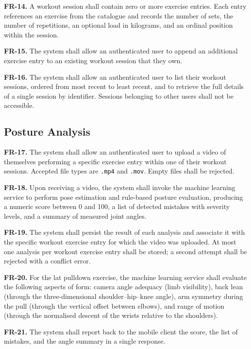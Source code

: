 \textbf{FR-14.} A workout session shall contain zero or more exercise entries. Each entry references an exercise from the catalogue and records the number of sets, the number of repetitions, an optional load in kilograms, and an ordinal position within the session.

\textbf{FR-15.} The system shall allow an authenticated user to append an additional exercise entry to an existing workout session that they own.

\textbf{FR-16.} The system shall allow an authenticated user to list their workout sessions, ordered from most recent to least recent, and to retrieve the full details of a single session by identifier. Sessions belonging to other users shall not be accessible.

\subsection{Posture Analysis}
\label{subsec:fr-analysis}

\textbf{FR-17.} The system shall allow an authenticated user to upload a video of themselves performing a specific exercise entry within one of their workout sessions. Accepted file types are \texttt{.mp4} and \texttt{.mov}. Empty files shall be rejected.

\textbf{FR-18.} Upon receiving a video, the system shall invoke the machine learning service to perform pose estimation and rule-based posture evaluation, producing a numeric score between 0 and 100, a list of detected mistakes with severity levels, and a summary of measured joint angles.

\textbf{FR-19.} The system shall persist the result of each analysis and associate it with the specific workout exercise entry for which the video was uploaded. At most one analysis per workout exercise entry shall be stored; a second attempt shall be rejected with a conflict error.

\textbf{FR-20.} For the lat pulldown exercise, the machine learning service shall evaluate the following aspects of form: camera angle adequacy (limb visibility), back lean (through the three-dimensional shoulder–hip–knee angle), arm symmetry during the pull (through the vertical offset between elbows), and range of motion (through the normalised descent of the wrists relative to the shoulders).

\textbf{FR-21.} The system shall report back to the mobile client the score, the list of mistakes, and the angle summary in a single response.


